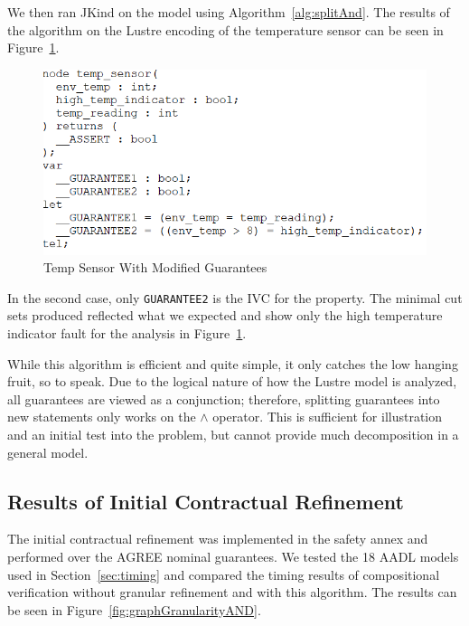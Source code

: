 We then ran JKind on the model using Algorithm~\ref{alg:splitAnd}. The results of the algorithm on the Lustre encoding of the temperature sensor can be seen in Figure~\ref{fig:lustreTwoGuar}. 

\begin{figure}[h!]
\begin{center}
\includegraphics[width=.8\textwidth]{images/lustreOneGuar.PNG}
\caption{Temp Sensor With Modified Guarantees} \label{fig:lustreTwoGuar}
\end{center}
\end{figure} 

 In the second case, only \texttt{GUARANTEE2} is the IVC for the property. The minimal cut sets produced reflected what we expected and show only the high temperature indicator fault for the analysis in Figure~\ref{fig:lustreTwoGuar}. 

While this algorithm is efficient and quite simple, it only catches the low hanging fruit, so to speak. Due to the logical nature of how the Lustre model is analyzed, all guarantees are viewed as a conjunction; therefore, splitting guarantees into new statements only works on the $\land$ operator. This is sufficient for illustration and an initial test into the problem, but cannot provide much decomposition in a general model. 

\subsection{Results of Initial Contractual Refinement}
\label{sec:resultsAND}
The initial contractual refinement was implemented in the safety annex and performed over the AGREE nominal guarantees. We tested the 18 AADL models used in Section~\ref{sec:timing} and compared the timing results of compositional verification without granular refinement and with this algorithm. The results can be seen in Figure~\ref{fig:graphGranularityAND}. 

